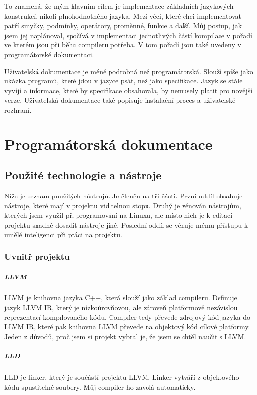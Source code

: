\documentclass[12pt, a4paper, titlepage, abstract=on]{scrreprt}
\begin{document}
To znamená, že mým hlavním cílem je implementace základních jazykových konstrukcí, nikoli plnohodnotného jazyka. Mezi věci, které chci implementovat patří smyčky, podmínky, operátory, proměnné, funkce a další. Můj postup, jak jsem jej naplánoval, spočívá v implementaci jednotlivých částí kompilace v pořadí ve kterém jsou
při běhu compileru potřeba. V tom pořadí jsou také uvedeny v programátorské dokumentaci.

Uživatelská dokumentace je méně podrobná než programátorská. Slouží spíše jako ukázka programů, které jdou v jazyce psát, než jako specifikace.
Jazyk se stále vyvíjí a informace, které by specifikace obsahovala, by nemusely platit pro novější verze. Uživatelská dokumentace také popisuje
instalační proces a uživatelské rozhraní.

\chapter{Programátorská dokumentace}
\section{Použité technologie a nástroje}
Níže je seznam použitých nástrojů. Je členěn na tři části. První oddíl obsahuje nástroje, které mají v projektu viditelnou stopu. Druhý je věnován nástrojům,
kterých jsem využil při programování na Linuxu, ale místo nich je k editaci projektu snadné dosadit nástroje jiné. Poslední oddíl se věnuje mému přístupu k
umělé inteligenci při práci na projektu.
\subsection{Uvnitř projektu}
\paragraph{\href{https://llvm.org/}{LLVM}}
LLVM je knihovna jazyka C++, která slouží jako základ compileru. Definuje jazyk LLVM IR, který je nízkoúrovňovou, ale zároveň platformově nezávislou
reprezentací kompilovaného kódu. Compiler tedy převede zdrojový kód jazyka do LLVM IR, které pak knihovna LLVM převede na objektový kód cílové platformy.
Jeden z důvodů, proč jsem si projekt vybral je, že jsem se chtěl naučit s LLVM.
\paragraph{\href{https://lld.llvm.org/}{LLD}}
LLD je linker, který je součástí projektu LLVM. Linker vytváří z objektového kódu spustitelné soubory. Můj compiler ho zavolá automaticky.
\end{document}

